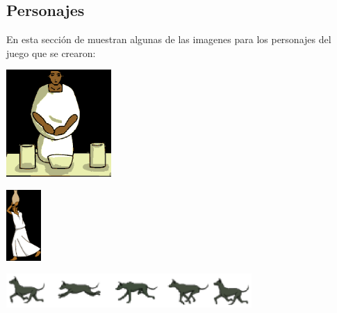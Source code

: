 \subsection{Personajes}
En esta sección de muestran algunas de las imagenes para los personajes del juego que se crearon:
\\
\par
\begin{center}
\includegraphics[width=0.3\textwidth]{09Anexos/sprites/mujer02}
\end{center}

\begin{center}
\includegraphics[width=0.1\textwidth]{09Anexos/sprites/muujer01}
\end{center}

\begin{center}
\includegraphics[width=0.7\textwidth]{09Anexos/sprites/xolotlAnimacion}
\end{center}